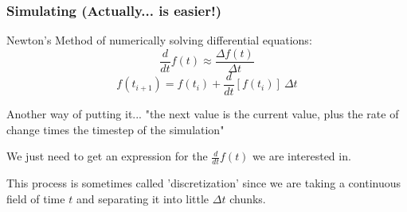 \documentclass{beamer}%
\begin{document}
\begin{frame}
	\frametitle{Simulating (Actually... is easier!)}
	
	Newton's Method of numerically solving differential equations:
	\begin{equation}
		\frac{d}{dt} f(t) \approx \frac{\Delta f(t)}{\Delta t}
	\end{equation}\begin{equation}
		f(t_{i+1}) = f(t_{i}) + \frac{d}{dt}[f(t_{i})]\ {\Delta t}
	\end{equation}
	
	Another way of putting it... "the next value is the current value, plus the rate of change times the timestep of the simulation"
	
	We just need to get an expression for the $\frac{d}{dt}f(t)$ we are interested in.
	
	This process is sometimes called 'discretization' since we are taking a continuous field of time $t$ and separating it into little $\Delta t$ chunks.
\end{frame}
\end{document}
